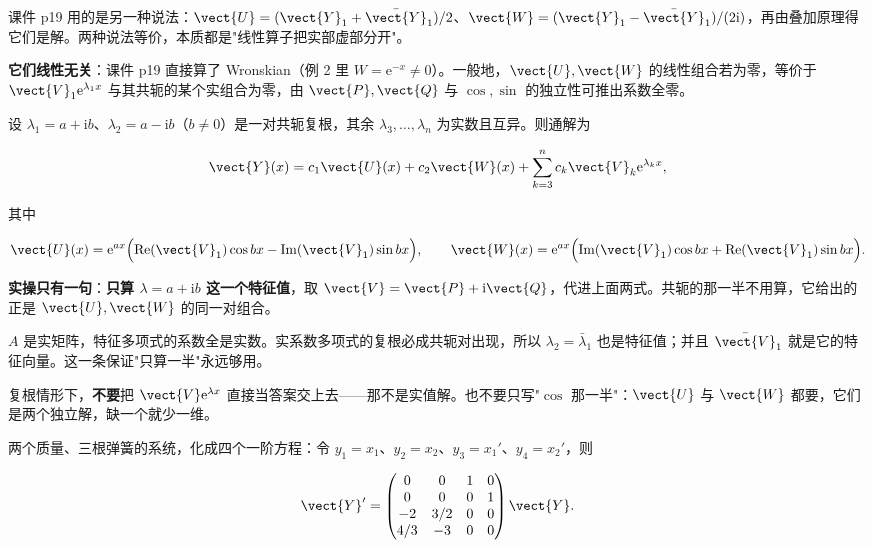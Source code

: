 \documentclass[11pt]{ctexart}
\begin{document}
课件 p19 用的是另一种说法：$\vect{U}=(\vect{Y}_1+\bar{\vect{Y}}_1)/2$、$\vect{W}=(\vect{Y}_1-\bar{\vect{Y}}_1)/(2\mathrm{i})$，再由叠加原理得它们是解。两种说法等价，本质都是"线性算子把实部虚部分开"。

\textbf{它们线性无关}：课件 p19 直接算了 Wronskian（例 2 里 $W=\mathrm{e}^{-x}\neq0$）。一般地，$\vect{U},\vect{W}$ 的线性组合若为零，等价于 $\vect{V}_1\mathrm{e}^{\lambda_1x}$ 与其共轭的某个实组合为零，由 $\vect{P},\vect{Q}$ 与 $\cos,\sin$ 的独立性可推出系数全零。


设 $\lambda_1=a+\mathrm{i}b$、$\lambda_2=a-\mathrm{i}b$（$b\neq0$）是一对共轭复根，其余 $\lambda_3,\dots,\lambda_n$ 为实数且互异。则通解为

\[
\vect{Y}(x)=c_1\vect{U}(x)+c_2\vect{W}(x)+\sum_{k=3}^{n}c_k\vect{V}_k\mathrm{e}^{\lambda_k x},
\]

其中

\[
\vect{U}(x)=\mathrm{e}^{ax}\Bigl(\operatorname{Re}(\vect{V}_1)\cos bx-\operatorname{Im}(\vect{V}_1)\sin bx\Bigr),
\qquad
\vect{W}(x)=\mathrm{e}^{ax}\Bigl(\operatorname{Im}(\vect{V}_1)\cos bx+\operatorname{Re}(\vect{V}_1)\sin bx\Bigr).
\]

\textbf{实操只有一句}：\textbf{只算 $\lambda=a+\mathrm{i}b$ 这一个特征值}，取 $\vect{V}=\vect{P}+\mathrm{i}\vect{Q}$，代进上面两式。共轭的那一半不用算，它给出的正是 $\vect{U},\vect{W}$ 的同一对组合。


$A$ 是实矩阵，特征多项式的系数全是实数。实系数多项式的复根必成共轭对出现，所以 $\lambda_2=\bar\lambda_1$ 也是特征值；并且 $\bar{\vect{V}}_1$ 就是它的特征向量。这一条保证"只算一半"永远够用。


复根情形下，\textbf{不要}把 $\vect{V}\mathrm{e}^{\lambda x}$ 直接当答案交上去——那不是实值解。也不要只写"$\cos$ 那一半"：$\vect{U}$ 与 $\vect{W}$ 都要，它们是两个独立解，缺一个就少一维。



两个质量、三根弹簧的系统，化成四个一阶方程：令 $y_1=x_1$、$y_2=x_2$、$y_3=x_1'$、$y_4=x_2'$，则

\[
\vect{Y}'=\begin{pmatrix}
0&0&1&0\\
0&0&0&1\\
-2&3/2&0&0\\
4/3&-3&0&0
\end{pmatrix}\vect{Y}.
\]
\end{document}
